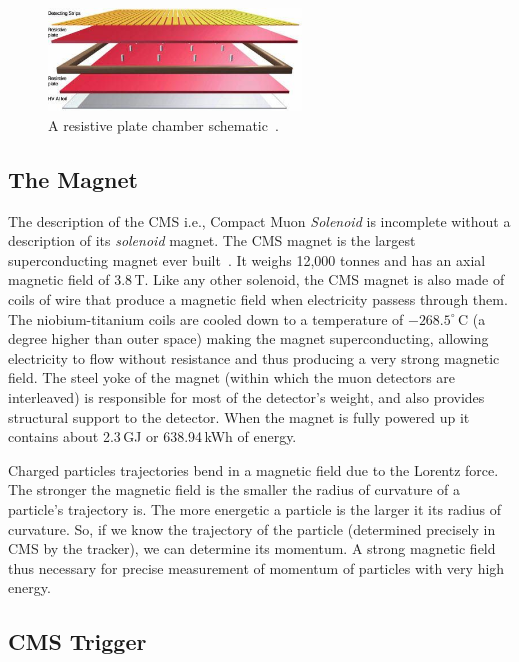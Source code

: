\begin{figure}
\begin{center}
  \includegraphics[width=0.6\textwidth,keepaspectratio]{plots_and_figures/chapter3/RPC.jpg}
\caption{A resistive plate chamber schematic~\cite{muon2}.}
\label{fig:rpc}
\end{center}
\end{figure}

\subsection{The Magnet}
\label{CMS magnet}
The description of the CMS i.e., Compact Muon \textit{Solenoid} is incomplete without a description of its \textit{solenoid} magnet. The CMS magnet is the largest superconducting magnet ever built~\cite{magnet}. It weighs 12,000 tonnes and has an axial magnetic field of 3.8\,T. Like any other solenoid, the CMS magnet is also made of coils of wire that produce a magnetic field when electricity passess through them. The niobium-titanium coils are cooled down to a temperature of $-268.5^{\circ}\,\mathrm{C}$ (a degree higher than outer space) making the magnet superconducting, allowing electricity to flow without resistance and thus producing a very strong magnetic field. The steel yoke of the magnet (within which the muon detectors are interleaved) is responsible for most of the detector's weight, and also provides structural support to the detector. When the magnet is fully powered up it contains about 2.3\,GJ or 638.94\,kWh of energy.

Charged particles trajectories bend in a magnetic field due to the Lorentz force. The stronger the magnetic field is the smaller the radius of curvature of a particle's trajectory is. The more energetic a particle is the larger it its radius of curvature. So, if we know the trajectory of the particle (determined precisely in CMS by the tracker), we can determine its momentum. A strong magnetic field thus necessary for precise measurement of momentum of particles with very high energy.


\subsection{CMS Trigger}
\label{trigger}

